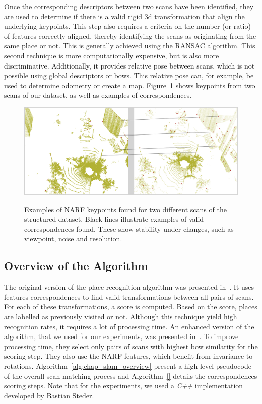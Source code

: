 Once the corresponding descriptors between two scans have been identified, they are used to determine if there is a valid rigid \gls*{3d} transformation that align the underlying keypoints. This step also requires a criteria on the number (or ratio) of features correctly aligned, thereby identifying the scans as originating from the same place or not. This is generally achieved using the RANSAC algorithm. This second technique is more computationally expensive, but is also more discriminative. Additionally, it provides relative pose between scans, which is not possible using global descriptors or \gls*{bow}s. This relative pose can, for example, be used to determine odometry or create a map. Figure~\ref{fig:chap_slam_features_correspondences} shows keypoints from two scans of our dataset, as well as examples of correspondences.

\begin{figure}[H]
    \centering
    \includegraphics[width=0.995\linewidth]{img/chap_slam/features_line.png}\\
    \caption{Examples of NARF keypoints found for two different scans of the structured dataset. Black lines illustrate examples of valid correspondences found. These show stability under changes, such as viewpoint, noise and resolution.}
    \label{fig:chap_slam_features_correspondences}
\end{figure}


\subsection{Overview of the Algorithm}
\label{ssec:chap_slam_algo}

The original version of the place recognition algorithm was presented in~\cite{Steder2010}. It uses features correspondences to find valid transformations between all pairs of scans. For each of these transformations, a score is computed. Based on the score, places are labelled as previously visited or not. Although this technique yield high recognition rates, it requires a lot of processing time. An enhanced version of the algorithm, that we used for our experiments, was presented in~\cite{Steder2011b}. To improve processing time, they select only pairs of scans with highest \gls*{bow} similarity for the scoring step. They also use the NARF features, which benefit from invariance to rotations. Algorithm~\ref{alg:chap_slam_overview} present a high level pseudocode of the overall scan matching process and Algorithm~\ref{} details the correspondences scoring steps. Note that for the experiments, we used a \textit{C++} implementation developed by Bastian Steder.

